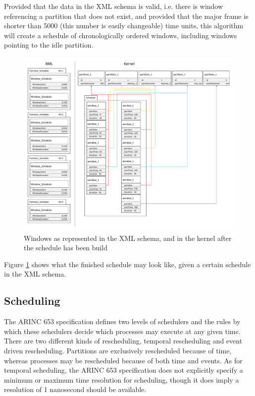 Provided that the data in the XML schema is valid, i.e. there is window 
referencing a partition that does not exist, and provided that the major frame
is shorter than 5000 (this number is easily changeable) time units, this
algorithm will create a schedule of chronologically ordered windows, including
windows pointing to the idle partition.\\

\begin{figure}
	\centerline{\includegraphics[width=\paperwidth,angle=90,clip,trim=0 1cm 0 0]{figures/demo_windows.pdf}}
	\caption{Windows as represented in the XML schema, and in the kernel after 
	the schedule has been build}
	\label{fig:demo_windows}
\end{figure}
Figure \ref{fig:demo_windows} shows what the finished schedule may look like,
given a certain schedule in the XML schema.


\subsection{Scheduling}
The ARINC 653 specification defines two levels of schedulers and the rules by
which these schedulers decide which processes may execute at any given time.
There are two different kinds of rescheduling, temporal rescheduling and event
driven rescheduling. Partitions are exclusively rescheduled because of time,
whereas processes may be rescheduled because of both time and events.
As for temporal scheduling, the ARINC 653 specification does not explicitly
specify a minimum or maximum time resolution for scheduling, though it does
imply a resolution of 1 nanosecond should be available\cite{arinc_time_resolution}.

